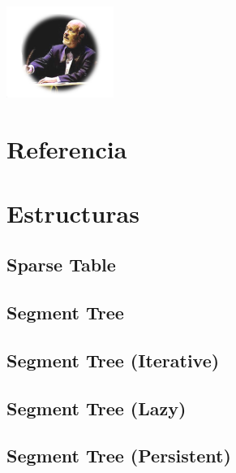 

\def\title{El Mastro - Mastropiero - UNS}

\begin{center}{\includegraphics[width=3.5cm]{../misc/mastro}}\end{center}

\tableofcontents\newpage
 
\section{Referencia}%


\section{Estructuras}%
\subsection{Sparse Table}
\subsection{Segment Tree}
\subsection{Segment Tree (Iterative)}
\subsection{Segment Tree (Lazy)}
\subsection{Segment Tree (Persistent)}
